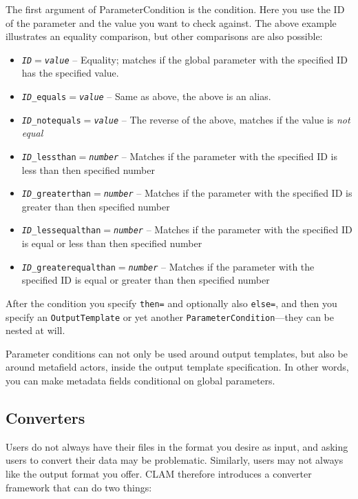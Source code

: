 \documentclass[a4paper,12pt]{report}
\begin{document}
The first argument of ParameterCondition is the condition. Here you use the ID of the parameter and the value you want to check against. The above example illustrates an equality comparison, but other comparisons are also possible:

\begin{itemize}
\item \texttt{\emph{ID}$=$\emph{value}} -- Equality; matches if the global parameter with the specified ID has the specified value.
\item \texttt{\emph{ID}\_equals$=$\emph{value}} -- Same as above, the above is an alias.
\item \texttt{\emph{ID}\_notequals$=$\emph{value}} -- The reverse of the above, matches if the value is \emph{not equal}
\item \texttt{\emph{ID}\_lessthan$=$\emph{number}} -- Matches if the parameter with the specified ID is less than then specified number
\item \texttt{\emph{ID}\_greaterthan$=$\emph{number}} -- Matches if the parameter with the specified ID is greater than then specified number
\item \texttt{\emph{ID}\_lessequalthan$=$\emph{number}} -- Matches if the parameter with the specified ID is equal or less than then specified number
\item \texttt{\emph{ID}\_greaterequalthan$=$\emph{number}} -- Matches if the parameter with the specified ID is equal or greater than then specified number
\end{itemize}

After the condition you specify \texttt{then=} and optionally also \texttt{else=}, and then you specify an \texttt{OutputTemplate} or yet another \texttt{ParameterCondition}---they can be nested at will.

Parameter conditions can not only be used around output templates, but also be around metafield actors, inside the output template specification. In other words, you can make metadata fields conditional on global parameters.


\subsection{Converters}

Users do not always have their files in the format you desire as input, and asking users to convert their data may be problematic. Similarly, users may not always like the output format you offer. CLAM therefore introduces a converter framework that can do two things:
\end{document}
